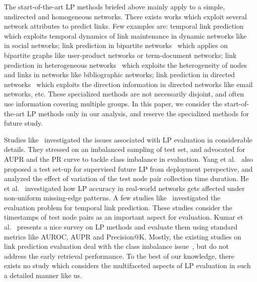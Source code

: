 The start-of-the-art LP methods briefed above mainly apply to a simple, undirected and homogeneous networks. There exists works which exploit several network attributes to predict links. Few examples are: temporal link prediction~\cite{sett2018temporal,qin2023temporal} which exploits temporal dynamics of link maintenance in dynamic networks like in social networks; link prediction in bipartite networks~\cite{kunegis2010link,ozer2024link} which applies on bipartite graphs like user-product networks or term-document networks; link prediction in heterogeneous networks~\cite{sett2018temporal,li2018link,wang2023multi} which exploits the heterogeneity of nodes and links in networks like bibliographic networks; link prediction in directed networks~\cite{schall2014link,sett2018exploiting} which exploits the direction information in directed networks like email networks, etc. These specialized methods are not necessarily disjoint, and often use information covering multiple groups. In this paper, we consider the start-of-the-art LP methods only in our analysis, and reserve the specialized methods for future study.

Studies like~\cite{lichtnwalter2012link,yang2015evaluating} investigated the issues associated with LP evaluation in considerable details. They stressed on an imbalanced sampling of test set, and advocated for AUPR and the PR curve to tackle class imbalance in evaluation. Yang et al.~\cite{yang2015evaluating} also proposed a test set-up for supervised future LP from deployment perspective, and analyzed the effect of variation of the test node pair collection time duration. He et al.~\cite{he2024link} investigated how LP accuracy in real-world networks gets affected under non-uniform missing-edge patterns. A few studies like~\cite{junuthula2016evaluating,poursafaei2022towards} investigated the evaluation problem for temporal link prediction. These studies consider the timestamps of test node pairs as an important aspect for evaluation. Kumar et al.~\cite{kumar2020link} presents a nice survey on LP methods and evaluate them using standard metrics like AUROC, AUPR and Precision@K. Mostly, the existing studies on link prediction evaluation deal with the class imbalance issue~\cite{lichtnwalter2012link,yang2015evaluating,kumar2020link,lichtenwalter2010new,masrour2020bursting,nasiri2023robust}, but do not address the early retrieval performance. To the best of our knowledge, there exists no study which considers the multifaceted aspects of LP evaluation in such a detailed manner like us.